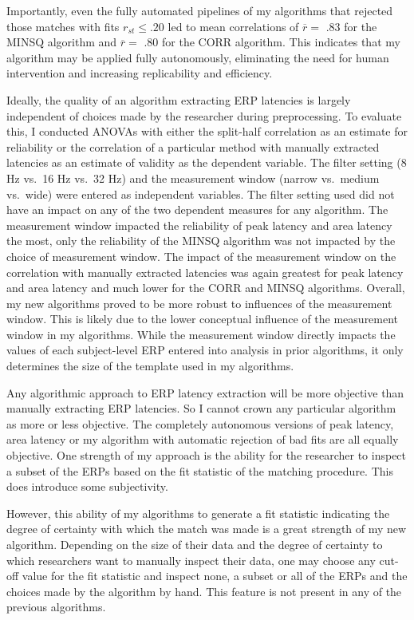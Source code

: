 \documentclass[
  man]{apa7}
\begin{document}
Importantly, even the fully automated pipelines of my algorithms that rejected those matches with fits \(r_{st} \le .20\) led to mean correlations of \(\overline{r} =\) .83 for the MINSQ algorithm and \(\overline{r} =\) .80 for the CORR algorithm. This indicates that my algorithm may be applied fully autonomously, eliminating the need for human intervention and increasing replicability and efficiency.

Ideally, the quality of an algorithm extracting ERP latencies is largely independent of choices made by the researcher during preprocessing. To evaluate this, I conducted ANOVAs with either the split-half correlation as an estimate for reliability or the correlation of a particular method with manually extracted latencies as an estimate of validity as the dependent variable. The filter setting (8 Hz vs.~16 Hz vs.~32 Hz) and the measurement window (narrow vs.~medium vs.~wide) were entered as independent variables. The filter setting used did not have an impact on any of the two dependent measures for any algorithm. The measurement window impacted the reliability of peak latency and area latency the most, only the reliability of the MINSQ algorithm was not impacted by the choice of measurement window. The impact of the measurement window on the correlation with manually extracted latencies was again greatest for peak latency and area latency and much lower for the CORR and MINSQ algorithms. Overall, my new algorithms proved to be more robust to influences of the measurement window. This is likely due to the lower conceptual influence of the measurement window in my algorithms. While the measurement window directly impacts the values of each subject-level ERP entered into analysis in prior algorithms, it only determines the size of the template used in my algorithms.

Any algorithmic approach to ERP latency extraction will be more objective than manually extracting ERP latencies. So I cannot crown any particular algorithm as more or less objective. The completely autonomous versions of peak latency, area latency or my algorithm with automatic rejection of bad fits are all equally objective. One strength of my approach is the ability for the researcher to inspect a subset of the ERPs based on the fit statistic of the matching procedure. This does introduce some subjectivity.

However, this ability of my algorithms to generate a fit statistic indicating the degree of certainty with which the match was made is a great strength of my new algorithm. Depending on the size of their data and the degree of certainty to which researchers want to manually inspect their data, one may choose any cut-off value for the fit statistic and inspect none, a subset or all of the ERPs and the choices made by the algorithm by hand. This feature is not present in any of the previous algorithms.
\end{document}
